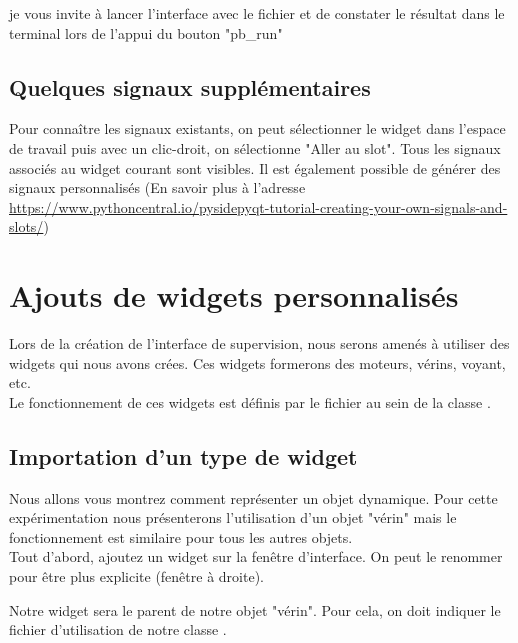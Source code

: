 je vous invite à lancer l'interface avec le fichier  et de constater le résultat dans le terminal lors de l'appui du bouton "pb\_run"
\section{Quelques signaux supplémentaires}

Pour connaître les signaux existants, on peut sélectionner le widget dans l'espace de travail puis avec un clic-droit, on sélectionne "Aller au slot". \newline
Tous les signaux associés au widget courant sont visibles.
Il est également possible de générer des signaux personnalisés (En savoir plus à l'adresse \url{https://www.pythoncentral.io/pysidepyqt-tutorial-creating-your-own-signals-and-slots/})



\chapter{Ajouts de widgets personnalisés}

Lors de la création de l'interface de supervision, nous serons amenés à utiliser des widgets qui nous avons crées. \newline
Ces widgets formerons des moteurs, vérins, voyant, etc. \\
Le fonctionnement de ces widgets est définis par le fichier  au sein de la classe .

\section{Importation d'un type de widget}

Nous allons vous montrez comment représenter un objet dynamique. Pour cette expérimentation nous présenterons l'utilisation d'un objet "vérin" mais le fonctionnement est similaire pour tous les autres objets.\\

Tout d'abord, ajoutez un widget sur la fenêtre d'interface.
On peut le renommer pour être plus explicite (fenêtre à droite).

Notre widget sera le parent de notre objet "vérin". Pour cela, on doit indiquer le fichier d'utilisation de notre classe .

